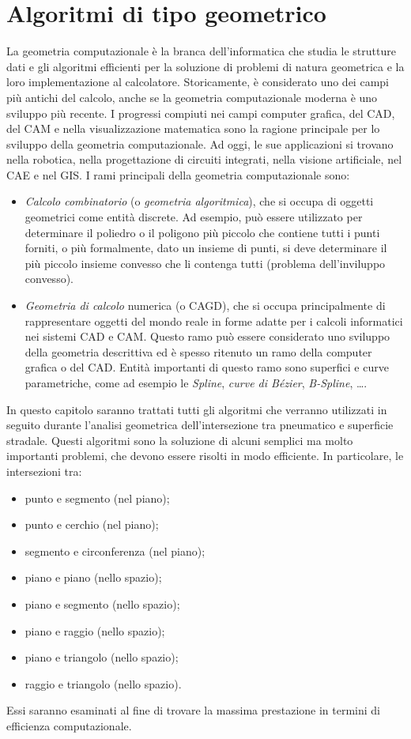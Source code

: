\section{Algoritmi di tipo geometrico}
%
La geometria computazionale è la branca dell'informatica che studia le strutture dati e gli algoritmi efficienti per la soluzione di problemi di natura geometrica e la loro implementazione al calcolatore. Storicamente, è considerato uno dei campi più antichi del calcolo, anche se la geometria computazionale moderna è uno sviluppo più recente. I progressi compiuti nei campi computer grafica, del \ac{CAD}, del \ac{CAM} e nella visualizzazione matematica sono la ragione principale per lo sviluppo della geometria computazionale. Ad oggi, le sue applicazioni si trovano nella robotica, nella progettazione di circuiti integrati, nella visione artificiale, nel \ac{CAE} e nel \ac{GIS}. I rami principali della geometria computazionale sono:
\begin{itemize}
	\item \textit{Calcolo combinatorio} (o \textit{geometria algoritmica}), che si occupa di oggetti geometrici come entità discrete. Ad esempio, può essere utilizzato per determinare il poliedro o il poligono più piccolo che contiene tutti i punti forniti, o più formalmente, dato un insieme di punti, si deve determinare il più piccolo insieme convesso che li contenga tutti (problema dell'inviluppo convesso).
	\item \textit{Geometria di calcolo} numerica (o \ac{CAGD}), che si occupa principalmente di rappresentare oggetti del mondo reale in forme adatte per i calcoli informatici nei sistemi \ac{CAD} e \ac{CAM}. Questo ramo può essere considerato uno sviluppo della geometria descrittiva ed è spesso ritenuto un ramo della computer grafica o del \ac{CAD}. Entità importanti di questo ramo sono superfici e curve parametriche, come ad esempio le \textit{Spline}, \textit{curve di Bézier}, \textit{B-Spline}, \dots.
\end{itemize}
In questo capitolo saranno trattati tutti gli algoritmi che verranno utilizzati in seguito durante l'analisi geometrica dell'intersezione tra pneumatico e superficie stradale. Questi algoritmi sono la soluzione di alcuni semplici ma molto importanti problemi, che devono essere risolti in modo efficiente. In particolare, le intersezioni tra:
\begin{itemize}
	\item punto e segmento (nel piano);
	\item punto e cerchio (nel piano);
	\item segmento e circonferenza (nel piano);
	\item piano e piano (nello spazio);
	\item piano e segmento (nello spazio);
	\item piano e raggio (nello spazio);
	\item piano e triangolo (nello spazio);
	\item raggio e triangolo (nello spazio).
\end{itemize}
Essi saranno esaminati al fine di trovare la massima prestazione in termini di efficienza computazionale.
%
